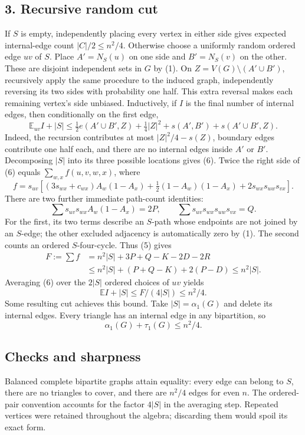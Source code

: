 \subsection*{3. Recursive random cut}
If $S$ is empty, independently placing every vertex in either side gives expected internal-edge count $|C|/2\le n^2/4$. Otherwise choose a uniformly random ordered edge $uv$ of $S$. Place $A'=N_S(u)$ on one side and $B'=N_S(v)$ on the other. These are disjoint independent sets in $G$ by (1). On $Z=V(G)\setminus(A'\cup B')$, recursively apply the same procedure to the induced graph, independently reversing its two sides with probability one half. This extra reversal makes each remaining vertex's side unbiased.
Inductively, if $I$ is the final number of internal edges, then conditionally on the first edge,
\[
 \mathbb E_{uv}I+|S|
 \le\tfrac12e(A'\cup B',Z)+\tfrac14|Z|^2
       +s(A',B')+s(A'\cup B',Z). \tag{6}
\]
Indeed, the recursion contributes at most $|Z|^2/4-s(Z)$, boundary edges contribute one half each, and there are no internal edges inside $A'$ or $B'$. Decomposing $|S|$ into its three possible locations gives (6).
Twice the right side of (6) equals $\sum_{w,x}f(u,v,w,x)$, where
\[
 f=s_{uv}\left[(3s_{wx}+c_{wx})A_w(1-A_x)
       +\tfrac12(1-A_w)(1-A_x)
       +2s_{wx}s_{uw}s_{vx}\right].
\]
There are two further immediate path-count identities:
\[
 \sum s_{uv}s_{wx}A_w(1-A_x)=2P,
 \qquad \sum s_{uv}s_{wx}s_{uw}s_{vx}=Q.
\]
For the first, its two terms describe an $S$-path whose endpoints are not joined by an $S$-edge; the other excluded adjacency is automatically zero by (1). The second counts an ordered $S$-four-cycle. Thus (5) gives
\begin{align*}
 F:=\sum f
 &=n^2|S|+3P+Q-K-2D-2R\\
 &\le n^2|S|+(P+Q-K)+2(P-D)
 \le n^2|S|.
\end{align*}
Averaging (6) over the $2|S|$ ordered choices of $uv$ yields
\[
 \mathbb EI+|S|\le F/(4|S|)\le n^2/4.
\]
Some resulting cut achieves this bound. Take $|S|=\alpha_1(G)$ and delete its internal edges. Every triangle has an internal edge in any bipartition, so
\[
 \boxed{\alpha_1(G)+\tau_1(G)\le n^2/4.}
\]

\subsection*{Checks and sharpness}
Balanced complete bipartite graphs attain equality: every edge can belong to $S$, there are no triangles to cover, and there are $n^2/4$ edges for even $n$. The ordered-pair convention accounts for the factor $4|S|$ in the averaging step. Repeated vertices were retained throughout the algebra; discarding them would spoil its exact form.

